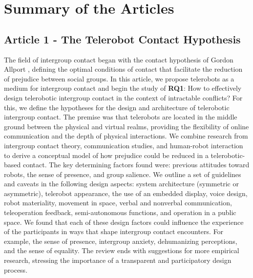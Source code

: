 \documentclass[dissertation,math,vertlayout,pdfa,colorlinks]{aaltoseries}
\begin{document}
\chapter{Summary of the Articles}
\section{Article 1 - The Telerobot Contact Hypothesis}
The field of intergroup contact began with the contact hypothesis of Gordon Allport \cite{allportNaturePrejudice1954}, defining the optimal conditions of contact that facilitate the reduction of prejudice between social groups. In this article, we propose telerobots as a medium for intergroup contact and begin the study of \textbf{RQ1}: How to effectively design telerobotic intergroup contact in the context of intractable conflicts? For this, we define the hypotheses for the design and architecture of telerobotic intergroup contact. The premise was that telerobots are located in the middle ground between the physical and virtual realms, providing the flexibility of online communication and the depth of physical interactions. We combine research from intergroup contact theory, communication studies, and human-robot interaction to derive a conceptual model of how prejudice could be reduced in a telerobotic-based contact. The key determining factors found were: previous attitudes toward robots, the sense of presence, and group salience. We outline a set of guidelines and caveats in the following design aspects: system architecture (symmetric or asymmetric), telerobot appearance, the use of an embedded display, voice design, robot materiality, movement in space, verbal and nonverbal communication, teleoperation feedback, semi-autonomous functions, and operation in a public space. We found that each of these design factors could influence the experience of the participants in ways that shape intergroup contact encounters. For example, the sense of presence, intergroup anxiety, dehumanizing perceptions, and the sense of equality. The review ends with suggestions for more empirical research, stressing the importance of a transparent and participatory design process.
\end{document}
